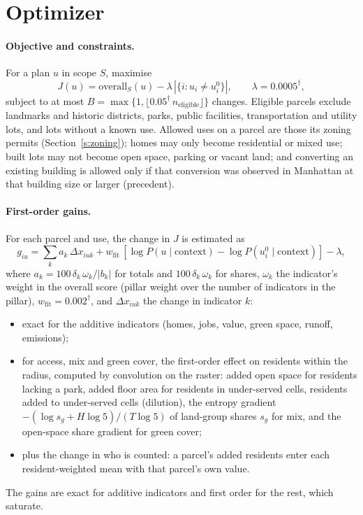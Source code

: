 \documentclass[10pt]{article}
\begin{document}
\section{Optimizer}\label{s:optimizer}

\paragraph{Objective and constraints.} For a plan $u$ in scope $S$, maximise
\begin{equation}
J(u) = \mathrm{overall}_S(u) - \lambda\,|\{i : u_i \neq u^0_i\}|,\qquad \lambda = 0.0005^\dagger,
\end{equation}
subject to at most $B = \max\{1, \lfloor 0.05^\dagger\, n_\mathrm{eligible}\rfloor\}$ changes. Eligible parcels exclude
landmarks and historic districts, parks, public facilities, transportation and utility lots, and lots without a
known use. Allowed uses on a parcel are those its zoning permits (Section~\ref{s:zoning}); homes may only become
residential or mixed use; built lots may not become open space, parking or vacant land; and converting an existing
building is allowed only if that conversion was observed in Manhattan at that building size or larger (precedent).

\paragraph{First-order gains.} For each parcel and use, the change in $J$ is estimated as
\begin{equation}
g_{iu} = \sum_k a_k\,\Delta x_{iuk} + w_\mathrm{fit}\,[\log P(u\mid\text{context}) - \log P(u^0_i\mid\text{context})] - \lambda,
\end{equation}
where $a_k = 100\,\delta_k\,\omega_k/|b_k|$ for totals and $100\,\delta_k\,\omega_k$ for shares, $\omega_k$ the
indicator's weight in the overall score (pillar weight over the number of indicators in the pillar),
$w_\mathrm{fit} = 0.002^\dagger$, and $\Delta x_{iuk}$ the change in indicator $k$:
\begin{itemize}
\item exact for the additive indicators (homes, jobs, value, green space, runoff, emissions);
\item for access, mix and green cover, the first-order effect on residents within the radius, computed by
convolution on the raster: added open space for residents lacking a park, added floor area for residents in
under-served cells, residents added to under-served cells (dilution), the entropy gradient
$-(\log s_g + H \log 5)/(T\log 5)$ of land-group shares $s_g$ for mix, and the open-space share gradient for green
cover;
\item plus the change in who is counted: a parcel's added residents enter each resident-weighted mean with that
parcel's own value.
\end{itemize}
The gains are exact for additive indicators and first order for the rest, which saturate.
\end{document}
